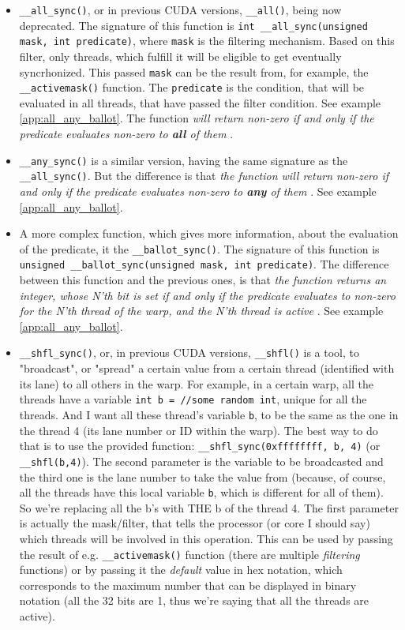 \begin{itemize}
    \item \verb|__all_sync()|, or in previous CUDA versions, \verb|__all()|, being now deprecated. The signature of this function is \verb|int __all_sync(unsigned mask, int predicate)|, 
      where \verb|mask| is the filtering mechanism. Based on this filter, only threads, which 
    fulfill it will be eligible to get eventually syncrhonized. This passed \verb|mask| 
  can be the result from, for example, the \verb|__activemask()| function. The \verb|predicate| is the 
  condition, that will be evaluated in all threads, that have passed the filter condition. See example \autoref{app:all_any_ballot}.
    The function \textsl{will return non-zero if and only if the predicate evaluates non-zero to \textbf{all} of them} \cite{center}.
  \item \verb|__any_sync()| is a similar version, having the same signature as the 
    \verb|__all_sync()|. But the difference is that \textsl{the function will return non-zero if and only if the predicate evaluates non-zero to \textbf{any} of them} \cite{center}. See example \autoref{app:all_any_ballot}.
  \item A more complex function, which gives more information, about the evaluation of the predicate,
    it the \verb|__ballot_sync()|. The signature of this function is \verb|unsigned __ballot_sync(unsigned mask, int predicate)|. The difference between this function and the previous ones, 
    is that \textsl{the function returns an integer, whose N'th bit is set if and only if the predicate evaluates to non-zero for the N'th thread of the warp, and the N'th thread is active} \cite{center}. See example \autoref{app:all_any_ballot}.
    \item \verb|__shfl_sync()|, or, in previous CUDA versions, \verb|__shfl()| is a tool, to "broadcast", or "spread"
        a certain value from a certain thread (identified with its lane) to all others in the warp. For example, 
        in a certain warp, all the threads have a variable \verb|int b = //some random int|, unique for all 
        the threads. And I want all these thread's variable \verb|b|, to be the same as the one in the thread 
        4 (its lane number or ID within the warp). The best way to do that is to use the provided function:
        \verb|__shfl_sync(0xffffffff, b, 4)| (or \verb|__shfl(b,4)|). The second parameter is the variable to be 
        broadcasted and the third one is the lane number to take the value from (because, of course, all the 
        threads have this local variable \verb|b|, which is different for all of them). So we're replacing all the 
        b's with THE b of the thread 4. The first parameter is actually the mask/filter, that tells the 
        processor (or core I should say) which threads will be involved in this operation. This can be used 
        by passing the result of e.g. \verb|__activemask()| function (there are multiple \textit{filtering} functions)
        or by passing it the \textit{default} value in hex notation, which corresponds to the maximum number 
        that can be displayed in binary notation (all the 32 bits are 1, thus we're saying that all the threads are active).


\end{itemize}
